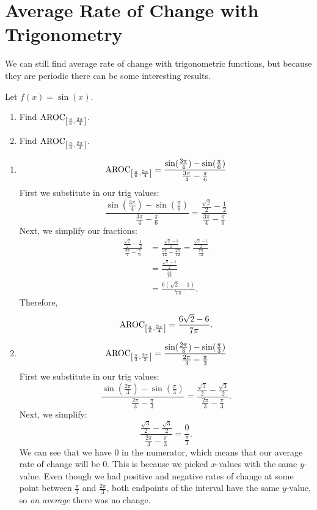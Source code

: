 \documentclass{ximera}
\begin{document}
\section{Average Rate of Change with Trigonometry}

We can still find average rate of change with trigonometric functions, but because they are periodic there can be some interesting results.

\begin{example}
Let $f(x) =\sin(x)$.
\begin{enumerate}
\item Find $\mathrm{AROC}_{\left[\frac{\pi}{6},\frac{3\pi}{4}\right]} $.
\item Find $\mathrm{AROC}_{\left[\frac{\pi}{3},\frac{2\pi}{3}\right]} $.
\end{enumerate}
\begin{explanation}
\begin{enumerate}
\item $$\mathrm{AROC}_{\left[\frac{\pi}{6},\frac{3\pi}{4}\right]}  = \frac{\sin(\frac{3\pi}{4})-\sin(\frac{\pi}{6})}{\frac{3\pi}{4} - \frac{\pi}{6}}$$
First we substitute in our trig values:
$$\frac{\sin(\frac{3\pi}{4})-\sin(\frac{\pi}{6})}{\frac{3\pi}{4} - \frac{\pi}{6}}=\frac{\frac{\sqrt{2}}{2}-\frac{1}{2}}{\frac{3\pi}{4} - \frac{\pi}{6}}$$
Next, we simplify our fractions:
\begin{align*}
\frac{\frac{\sqrt{2}}{2}-\frac{1}{2}}{\frac{3\pi}{4} - \frac{\pi}{6}} & = \frac{\frac{\sqrt{2}-1}{2}}{\frac{9\pi}{12} - \frac{2\pi}{12}}= \frac{\frac{\sqrt{2}-1}{2}}{\frac{7\pi}{12}}\\
& = \frac{\frac{\sqrt{2}-1}{2}}{\frac{7\pi}{12}} \\
& =\frac{6(\sqrt{2}-1)}{7\pi}.
\end{align*}
Therefore, 
$$\mathrm{AROC}_{\left[\frac{\pi}{6},\frac{3\pi}{4}\right]} =\frac{6\sqrt{2}-6}{7\pi}.$$

\item $$\mathrm{AROC}_{\left[\frac{\pi}{3},\frac{2\pi}{3}\right]} = \frac{\sin(\frac{2\pi}{3})-\sin(\frac{\pi}{3})}{\frac{2\pi}{3} - \frac{\pi}{3}}$$
First we substitute in our trig values:
$$\frac{\sin(\frac{2\pi}{3})-\sin(\frac{\pi}{3})}{\frac{2\pi}{3} - \frac{\pi}{3}} = \frac{\frac{\sqrt{3}}{2}-\frac{\sqrt{3}}{2}}{\frac{2\pi}{3} - \frac{\pi}{3}}.$$
Next, we simplify:
$$\frac{\frac{\sqrt{3}}{2}-\frac{\sqrt{3}}{2}}{\frac{2\pi}{3} - \frac{\pi}{3}}=\frac{0}{\frac{\pi}{3}}.$$
We can see that we have $0$ in the numerator, which means that our average rate of change will be $0$. This is because we picked $x$-values with the same $y$-value. Even though we had positive and negative rates of change at some point between $\frac{\pi}{3}$ and $\frac{2\pi}{3}$, both endpoints of the interval have the same $y$-value, so \emph{on average} there was no change.
\end{enumerate}
\end{explanation}
\end{example}
\end{document}
